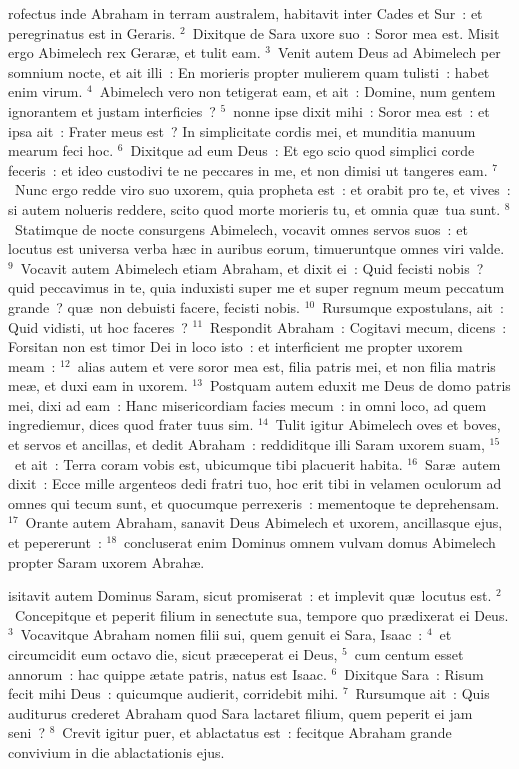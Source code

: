 \bchapter
{}rofectus inde Abraham in terram australem, habitavit inter Cades et Sur~: et peregrinatus est in Geraris.
${}^{2}$~Dixitque de Sara uxore suo~: Soror mea est. Misit ergo Abimelech rex Gerar\ae , et tulit eam.
${}^{3}$~Venit autem Deus ad Abimelech per somnium nocte, et ait illi~: En morieris propter mulierem quam tulisti~: habet enim virum.
${}^{4}$~Abimelech vero non tetigerat eam, et ait~: Domine, num gentem ignorantem et justam interficies~?
${}^{5}$~nonne ipse dixit mihi~: Soror mea est~: et ipsa ait~: Frater meus est~? In simplicitate cordis mei, et munditia manuum mearum feci hoc.
${}^{6}$~Dixitque ad eum Deus~: Et ego scio quod simplici corde feceris~: et ideo custodivi te ne peccares in me, et non dimisi ut tangeres eam.
${}^{7}$~Nunc ergo redde viro suo uxorem, quia propheta est~: et orabit pro te, et vives~: si autem nolueris reddere, scito quod morte morieris tu, et omnia qu\ae\ tua sunt.
${}^{8}$~Statimque de nocte consurgens Abimelech, vocavit omnes servos suos~: et locutus est universa verba h\ae c in auribus eorum, timueruntque omnes viri valde.
${}^{9}$~Vocavit autem Abimelech etiam Abraham, et dixit ei~: Quid fecisti nobis~? quid peccavimus in te, quia induxisti super me et super regnum meum peccatum grande~? qu\ae\ non debuisti facere, fecisti nobis.
${}^{10}$~Rursumque expostulans, ait~: Quid vidisti, ut hoc faceres~?
${}^{11}$~Respondit Abraham~: Cogitavi mecum, dicens~: Forsitan non est timor Dei in loco isto~: et interficient me propter uxorem meam~:
${}^{12}$~alias autem et vere soror mea est, filia patris mei, et non filia matris me\ae , et duxi eam in uxorem.
${}^{13}$~Postquam autem eduxit me Deus de domo patris mei, dixi ad eam~: Hanc misericordiam facies mecum~: in omni loco, ad quem ingrediemur, dices quod frater tuus sim.
${}^{14}$~Tulit igitur Abimelech oves et boves, et servos et ancillas, et dedit Abraham~: reddiditque illi Saram uxorem suam,
${}^{15}$~et ait~: Terra coram vobis est, ubicumque tibi placuerit habita.
${}^{16}$~Sar\ae\ autem dixit~: Ecce mille argenteos dedi fratri tuo, hoc erit tibi in velamen oculorum ad omnes qui tecum sunt, et quocumque perrexeris~: mementoque te deprehensam.
${}^{17}$~Orante autem Abraham, sanavit Deus Abimelech et uxorem, ancillasque ejus, et pepererunt~:
${}^{18}$~concluserat enim Dominus omnem vulvam domus Abimelech propter Saram uxorem Abrah\ae .

\bchapter
{}isitavit autem Dominus Saram, sicut promiserat~: et implevit qu\ae\ locutus est.
${}^{2}$~Concepitque et peperit filium in senectute sua, tempore quo pr\ae dixerat ei Deus.
${}^{3}$~Vocavitque Abraham nomen filii sui, quem genuit ei Sara, Isaac~:
${}^{4}$~et circumcidit eum octavo die, sicut pr\ae ceperat ei Deus,
${}^{5}$~cum centum esset annorum~: hac quippe \ae tate patris, natus est Isaac.
${}^{6}$~Dixitque Sara~: Risum fecit mihi Deus~: quicumque audierit, corridebit mihi.
${}^{7}$~Rursumque ait~: Quis auditurus crederet Abraham quod Sara lactaret filium, quem peperit ei jam seni~?
${}^{8}$~Crevit igitur puer, et ablactatus est~: fecitque Abraham grande convivium in die ablactationis ejus.


